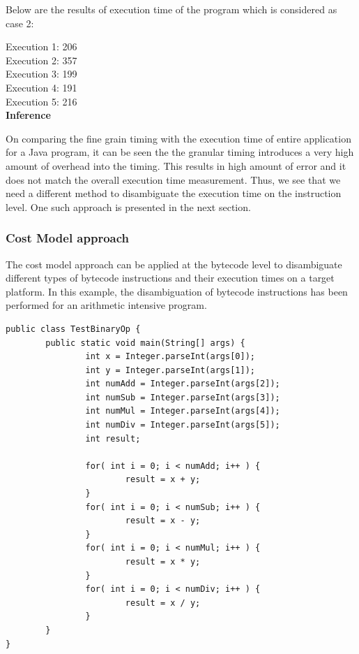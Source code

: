 \documentclass[11pt]{article}
\begin{document}
Below are the results of execution time of the program which is considered as case 2:

Execution 1: 206\\
Execution 2: 357\\
Execution 3: 199\\
Execution 4: 191\\
Execution 5: 216\\

\textbf{Inference}

On comparing the fine grain timing with the execution time of entire application for a Java program, it can be seen the the granular timing introduces a very high amount of overhead into the timing. This results in high amount of error and it does not match the overall execution time measurement. Thus, we see that we need a different method to disambiguate the execution time on the instruction level. One such approach is presented in the next section.\\

\subsubsection{Cost Model approach}

The cost model approach can be applied at the bytecode level to disambiguate different types of bytecode instructions and their execution times on a target platform. In this example, the disambiguation of bytecode instructions has been performed for an arithmetic intensive program.

\begin{lstlisting}
public class TestBinaryOp {
        public static void main(String[] args) {
                int x = Integer.parseInt(args[0]);
                int y = Integer.parseInt(args[1]);
                int numAdd = Integer.parseInt(args[2]);
                int numSub = Integer.parseInt(args[3]);
                int numMul = Integer.parseInt(args[4]);
                int numDiv = Integer.parseInt(args[5]);
                int result;
              
                for( int i = 0; i < numAdd; i++ ) {
                        result = x + y;
                }
                for( int i = 0; i < numSub; i++ ) {
                        result = x - y;
                }
                for( int i = 0; i < numMul; i++ ) {
                        result = x * y;
                }
                for( int i = 0; i < numDiv; i++ ) {
                        result = x / y;
                }
        }
}
\end{lstlisting}
\end{document}
